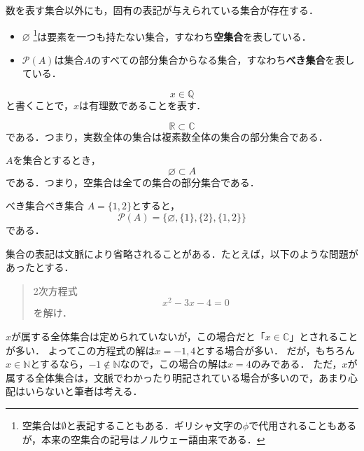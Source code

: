 \documentclass[a4paper,11pt]{ltjsarticle}
\renewcommand{\emph}[1]{\textbf{#1}}
\begin{document}
      
      \begin{shadebox}
        数を表す集合以外にも，固有の表記が与えられている集合が存在する．
        \begin{itemize}
        \item $\varnothing$ \footnote{空集合は$\emptyset$と表記することもある．ギリシャ文字の$\phi$で代用されることもあるが，本来の空集合の記号はノルウェー語由来である．}は要素を一つも持たない集合，すなわち\emph{空集合}を表している．
        \item $\mathcal{P}(A)$は集合$A$のすべての部分集合からなる集合，すなわち\emph{べき集合}を表している．
       \end{itemize}
      \end{shadebox}
      
      
      
        \begin{example}{}{}
            \[
            x \in \mathbb{Q}
          \]
          と書くことで，$x$は有理数であることを表す．
        \end{example}
      
        \begin{example}{}{}
            \[
            \mathbb{R} \subset \mathbb{C}
          \]
          である．つまり，実数全体の集合は複素数全体の集合の部分集合である．
        \end{example}
      
        \begin{example}{}{}
          $A$を集合とするとき，
          \[
          \varnothing  \subset A
        \]
        である．つまり，空集合は全ての集合の部分集合である．
      \end{example}
      
        \begin{example}{べき集合}{べき集合}
          $A=\{ 1, 2\}$とすると，
          \[
          \mathcal{P}(A) = \{ \varnothing, \{1\}, \{2\}, \{1, 2\}\}
        \]
        である．
      \end{example}
      
      
      
      集合の表記は文脈により省略されることがある．たとえば，以下のような問題があったとする．
      \begin{quotation}
        2次方程式
        \[
        x^2 - 3x -4 =0
        \]
        を解け．
      \end{quotation}
      $x$が属する全体集合は定められていないが，この場合だと「$x \in \mathbb{C}$」とされることが多い．
      よってこの方程式の解は$x = -1 , 4$とする場合が多い．
      だが，もちろん$ x \in \mathbb{N}$とするなら，$ -1 \notin \mathbb{N}$なので，この場合の解は$ x= 4$のみである．
      ただ，$x$が属する全体集合は，文脈でわかったり明記されている場合が多いので，あまり心配はいらないと筆者は考える．
      
\end{document}
